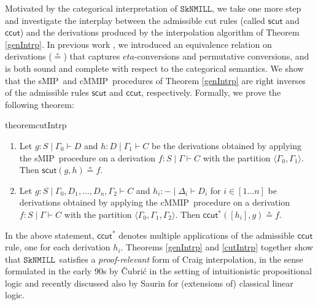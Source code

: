 \documentclass[sn-mathphys-num]{sn-jnl}%
\newcommand{\GG}{\Gamma}
\newcommand{\GD}{\Delta}
\newcommand{\vd}{\vdash}
\newcommand{\bsls}{\backslash}
\newcommand{\SkNMILL}{$\mathtt{SkNMILL}$}
\newcommand{\mf}[1]{\mathsf{#1}}
\newcommand{\sMIP}{\textsf{sMIP}}
\newcommand{\cMMIP}{\textsf{cMMIP}}
\theoremstyle{thmstyleone}%
\theoremstyle{thmstyletwo}%
\theoremstyle{thmstylethree}%
\begin{document}
Motivated by the categorical interpretation of \SkNMILL, we take one more step and investigate the interplay between the admissible cut rules (called $\mf{scut}$ and $\mf{ccut}$) and the derivations produced by the interpolation algorithm of Theorem \ref{genIntrp}.
In previous work \cite{UVW:protsn}, we introduced an equivalence relation on derivations ($\circeq$) that captures $eta$-conversions and permutative conversions, and is both sound and complete with respect to the categorical semantics.
We show that the \sMIP~and \cMMIP~procedures of Theorem \ref{genIntrp} are right inverses of the admissible rules $\mf{scut}$ and $\mf{ccut}$, respectively. Formally, we prove the following theorem:
\begin{restatable*}{theorem}{cutIntrp}\label{cutIntrp}
  \begin{enumerate}[label=(\roman*)]
  \item Let $g : S \mid \GG_0 \vd D$ and $h : D \mid \GG_1 \vd C$ be the derivations obtained by applying the \sMIP~procedure on a derivation $f: S \mid \GG \vd C$ with the partition $\langle \GG_0 , \GG_1 \rangle$. Then $\mf{scut}(g, h) \circeq f$.
  \item Let $g : S \mid \GG_0 , D_1 , \dots, D_n, \GG_2 \vd C$ and $h_i : {-} \mid \GD_i \vd D_i$ for $i \in [1 \dots n]$ be derivations obtained by applying the \cMMIP~procedure on a derivation $f: S \mid \GG \vd C$ with the partition $\langle \GG_0 , \GG_1 , \GG_2 \rangle$. Then $\mf{ccut}^*([h_i] , g) \circeq f$.
  \end{enumerate}
\end{restatable*}

In the above statement, $\mf{ccut}^*$ denotes multiple applications of the admissible $\mf{ccut}$ rule, one for each derivation $h_i$.
Theorems \ref{genIntrp} and \ref{cutIntrp} together show that \SkNMILL\ satisfies a \emph{proof-relevant} form of Craig interpolation, in the sense  formulated in the early 90s by {\v{C}}ubri{\'c} \cite{Cubric1994} in the setting of intuitionistic propositional logic and recently discussed also by Saurin \cite{Saurin2024} for (extensions of) classical linear logic.

\end{document}
